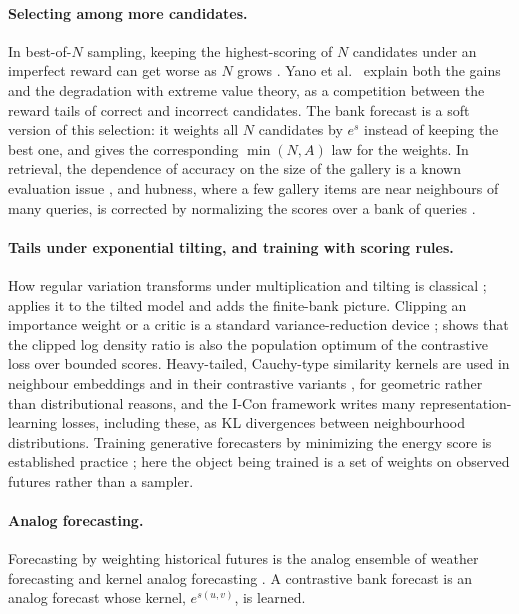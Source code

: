 \documentclass[11pt]{article}
\theoremstyle{plain}
\theoremstyle{definition}
\theoremstyle{remark}
\begin{document}
\paragraph{Selecting among more candidates.}
In best-of-$N$ sampling, keeping the highest-scoring of $N$ candidates under
an imperfect reward can get worse as $N$ grows
\cite{huang2025bestofn,jinnai2024regularized,yu2026curiosity}. Yano et al.\
\cite{yano2026tail} explain both the gains and the degradation with extreme
value theory, as a competition between the reward tails of correct and
incorrect candidates. The bank forecast is a soft version of this selection:
it weights all $N$ candidates by $e^{s}$ instead of keeping the best one, and
\Cref{thm:exposure} gives the corresponding $\min(N,A)$ law for the weights.
In retrieval, the dependence of accuracy on the size of the gallery is a
known evaluation issue \cite{meivar2026webscale,argueta2026lineups}, and
hubness, where a few gallery items are near neighbours of many queries, is
corrected by normalizing the scores over a bank of queries
\cite{bogolin2022qbnorm,wang2023balance}.

\paragraph{Tails under exponential tilting, and training with scoring rules.}
How regular variation transforms under multiplication and tilting is
classical \cite{resnick2007heavy}; \Cref{ssec:saturation} applies it to the
tilted model and adds the finite-bank picture. Clipping an importance weight
or a critic is a standard variance-reduction device
\cite{ionides2008truncated,song2020limitations};  shows that
the clipped log density ratio is also the population optimum of the
contrastive loss over bounded scores. Heavy-tailed, Cauchy-type similarity
kernels are used in neighbour embeddings and in their contrastive variants
\cite{maaten2008tsne,bohm2023unsupervised}, for geometric rather than
distributional reasons, and the I-Con framework \cite{alshammari2025icon}
writes many representation-learning losses, including these, as KL
divergences between neighbourhood distributions. Training generative forecasters by minimizing the
energy score is established practice
\cite{gneiting2007strictly,pacchiardi2024probabilistic,shen2024engression};
here the object being trained is a set of weights on observed futures rather
than a sampler.

\paragraph{Analog forecasting.}
Forecasting by weighting historical futures is the analog ensemble of
weather forecasting \cite{dellemonache2013analog} and kernel analog
forecasting \cite{zhao2016analog}. A contrastive bank forecast is an analog
forecast whose kernel, $e^{s(u,v)}$, is learned.
\end{document}
